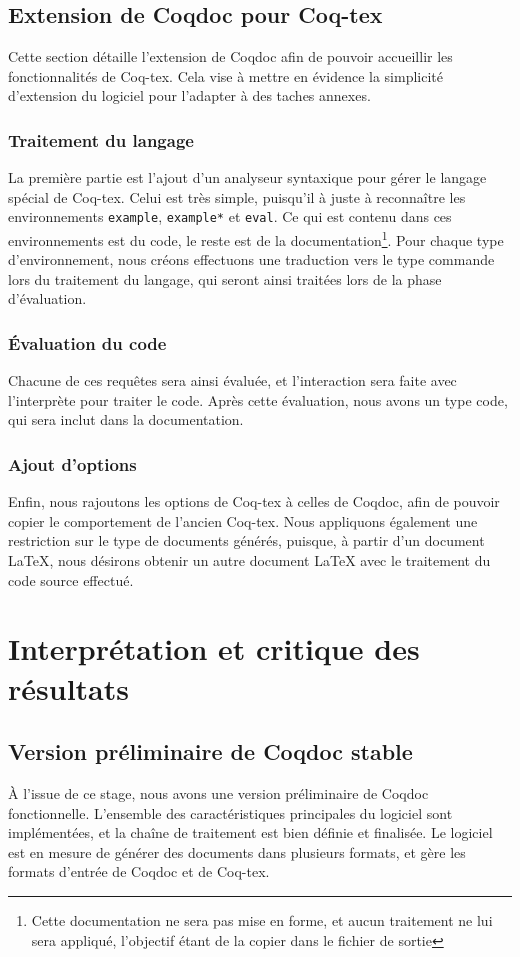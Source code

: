\documentclass[a4paper, 11pt]{report}
\begin{document}
    \clearpage
    \subsection{Extension de Coqdoc pour Coq-tex}
    \label{coqtex}
    Cette section détaille l'extension de Coqdoc afin de pouvoir accueillir
    les fonctionnalités de Coq-tex. Cela vise à mettre en évidence la simplicité
    d'extension du logiciel pour l'adapter à des taches annexes.
    \subsubsection{Traitement du langage}
    La première partie est l'ajout d'un analyseur syntaxique pour gérer le
    langage spécial de Coq-tex. Celui est très simple, puisqu'il à juste
    à reconnaître les environnements \texttt{example}, \texttt{example*} et
    \texttt{eval}. Ce qui est contenu dans ces environnements est du code, le
    reste est de la documentation\footnote{Cette documentation ne sera pas
    mise en forme, et aucun traitement ne lui sera appliqué, l'objectif étant
    de la copier dans le fichier de sortie}.
    Pour chaque type d'environnement, nous créons effectuons une traduction
    vers le type commande lors du traitement du langage, qui seront ainsi
    traitées lors de la phase d'évaluation.

    \subsubsection{Évaluation du code}
    Chacune de ces requêtes sera ainsi évaluée, et l'interaction sera faite avec
    l'interprète pour traiter le code. Après cette évaluation, nous avons
    un type code, qui sera inclut dans la documentation.
    \subsubsection{Ajout d'options}
    Enfin, nous rajoutons les options de Coq-tex à celles de Coqdoc, afin
    de pouvoir copier le comportement de l'ancien Coq-tex. Nous appliquons
    également une restriction sur le type de documents générés, puisque, à
    partir d'un document LaTeX, nous désirons obtenir un autre document LaTeX avec
    le traitement du code source effectué.
    \clearpage
  \section{Interprétation et critique des résultats}
    \subsection{Version préliminaire de Coqdoc stable}
    À l'issue de ce stage, nous avons une version préliminaire de Coqdoc
    fonctionnelle. L'ensemble des caractéristiques principales du logiciel sont
    implémentées, et la chaîne de traitement est bien définie et finalisée.
    Le logiciel est en mesure de générer des documents dans plusieurs formats,
    et gère les formats d'entrée de Coqdoc et de Coq-tex.
\end{document}
